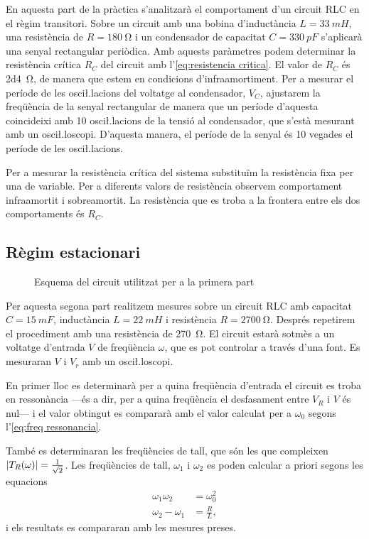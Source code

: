 En aquesta part de la pràctica s'analitzarà el comportament d'un circuit RLC en el règim transitori. Sobre un circuit amb una bobina d'inductància \( L = \SI{33}{mH} \), una resistència de \( R = \SI{180}{\ohm} \) i un condensador de capacitat \( C  = \SI{330}{pF} \) s'aplicarà una senyal rectangular periòdica. Amb aquests paràmetres podem determinar la resistència crítica \( R_C \) del circuit amb l'\cref{eq:resistencia critica}. El valor de \( R_C \) és \SI{2d4}{\ohm}, de manera que estem en condicions d'infraamortiment. Per a mesurar el període de les osci\l.lacions del voltatge al condensador, \( V_C \), ajustarem la freqüència de la senyal rectangular de manera que un període d'aquesta coincideixi amb 10 osci\l.lacions de la tensió al condensador, que s'està mesurant amb un osci\l.loscopi. D'aquesta manera, el període de la senyal és 10 vegades el període de les osci\l.lacions.

Per a mesurar la resistència crítica del sistema substituïm la resistència fixa per una de variable. Per a diferents valors de resistència observem comportament infraamortit i sobreamortit. La resistència que es troba a la frontera entre els dos comportaments és \( R_C \).  

\subsection{Règim estacionari}
\begin{figure}[htb]
	\centering \small \sffamily
	
	\caption{Esquema del circuit utilitzat per a la primera part}
	\label{fig:esquema estacionari}
\end{figure}

Per aquesta segona part realitzem mesures sobre un circuit RLC amb capacitat \( C = \SI{15}{mF} \), inductància \( L = \SI{22}{mH} \) i resistència \( R = \SI{2700}{\ohm} \). Després repetirem el procediment amb una resistència de \SI{270}{\ohm}. El circuit estarà sotmès a un voltatge d'entrada \( V \) de freqüència \( \omega \), que es pot controlar a través d'una font. Es mesuraran \( V \) i \( V_r \) amb un osci\l.loscopi.  

En primer lloc es determinarà per a quina freqüència d'entrada el circuit es troba en ressonància ---és a dir, per a quina freqüència el desfasament entre \( V_R \) i \( V \) és nul--- i el valor obtingut es compararà amb el valor calculat per a \( \omega_0 \) segons l'\cref{eq:freq ressonancia}. 

També es determinaran les freqüències de tall, que són les que compleixen \( \left\lvert T_R(\omega) \right\rvert = \frac{1}{\sqrt{2}} \). Les freqüències de tall, \( \omega_1 \) i \( \omega_2 \) es poden calcular a priori segons les equacions
\begin{equation} \label{eq:freqs de tall}
	\begin{aligned}
		\omega_1\omega_2 &= \omega_0^2 \\
		\omega_2 - \omega_1 &= \frac{R}{L},
	\end{aligned}
\end{equation}
i els resultats es compararan amb les mesures preses. 

